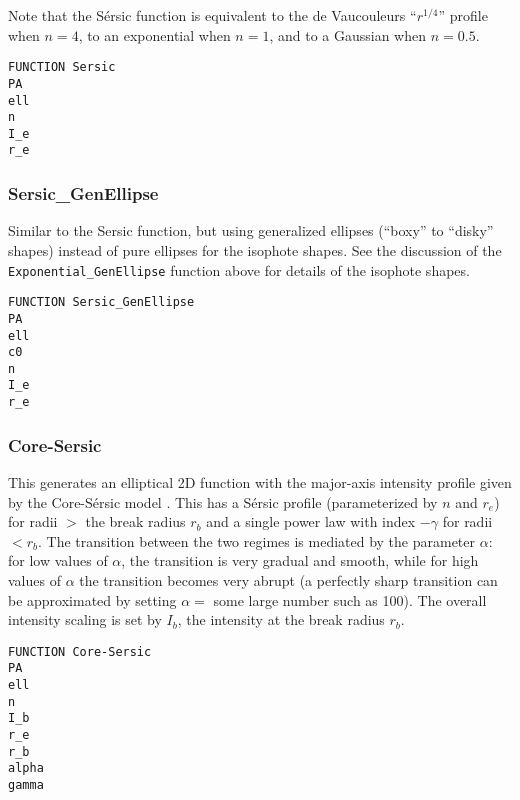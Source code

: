 \documentclass[10pt,a4paper,article]{memoir}
\begin{document}
Note that the S\'ersic function is equivalent to the de Vaucouleurs ``$r^{1/4}$'' profile
when $n = 4$, to an exponential when $n = 1$, and to a Gaussian when $n = 0.5$.

\begin{verbatim}
FUNCTION Sersic
PA
ell
n
I_e
r_e
\end{verbatim}


\subsubsection{Sersic\_GenEllipse}

Similar to the Sersic function, but using generalized ellipses (``boxy'' to
``disky'' shapes) instead of pure ellipses for the isophote shapes.  See the
discussion of the \texttt{Exponential\_GenEllipse} function above for details of the isophote
shapes.

\begin{verbatim}
FUNCTION Sersic_GenEllipse
PA
ell
c0
n
I_e
r_e
\end{verbatim}



\subsubsection{Core-Sersic}

This generates an elliptical 2D function with the major-axis intensity profile
given by the Core-S{\'e}rsic model \citep{graham03,trujillo04}. This has a
S\'ersic profile (parameterized by $n$ and $r_{e}$) for radii $>$ the break
radius $r_{b}$ and a single power law with index $-\gamma$ for radii $< r_{b}$.
The transition between the two regimes is mediated by the parameter $\alpha$:
for low values of $\alpha$, the transition is very gradual and smooth, while for
high values of $\alpha$ the transition becomes very abrupt (a perfectly sharp
transition can be approximated by setting $\alpha =$
some large number such as 100). The overall intensity scaling is set by $I_{b}$,
the intensity at the break radius $r_{b}$.

\begin{verbatim}
FUNCTION Core-Sersic
PA
ell
n
I_b
r_e
r_b
alpha
gamma
\end{verbatim}



%
%
\end{document}
